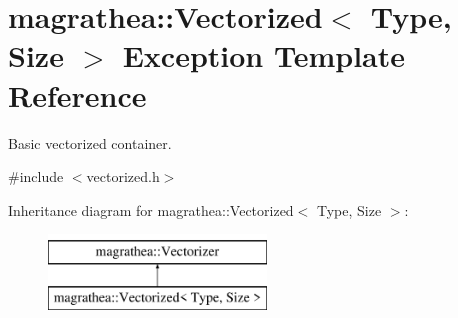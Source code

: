 \hypertarget{exceptionmagrathea_1_1Vectorized}{\section{magrathea\-:\-:Vectorized$<$ Type, Size $>$ Exception Template Reference}
\label{exceptionmagrathea_1_1Vectorized}
}


Basic vectorized container.  




{\ttfamily \#include $<$vectorized.\-h$>$}

Inheritance diagram for magrathea\-:\-:Vectorized$<$ Type, Size $>$\-:\begin{figure}[H]
\begin{center}
\leavevmode
\includegraphics[height=2.000000cm]{exceptionmagrathea_1_1Vectorized}
\end{center}
\end{figure}
